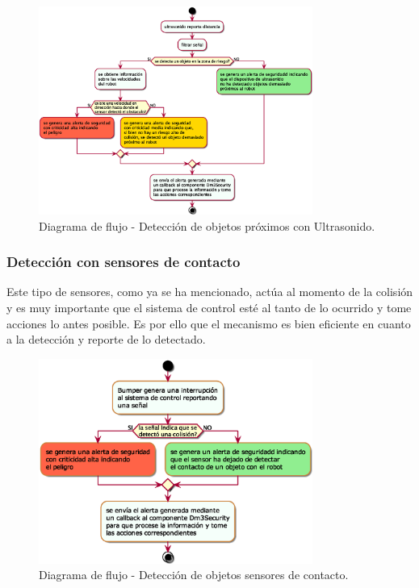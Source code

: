 \documentclass[withindex,glossary]{cam-thesis}
\begin{document}
\begin{figure}[H]
\centering
\includegraphics[width=0.8\textwidth]{images/Diagrama_de_flujo_Dm3Security_Ultrasonic}
\caption[Diagrama de flujo - Detección de objetos próximos con Ultrasonido]{Diagrama de flujo - Detección de objetos próximos con Ultrasonido.}
\end{figure}

\subsubsection{Detección con sensores de contacto} \label{sec:Implementacion :: detección de objetos próximos :: Contacto}
Este tipo de sensores, como ya se ha mencionado, actúa al momento de la colisión y es muy importante que el sistema de control esté al tanto de lo ocurrido y tome acciones lo antes posible. Es por ello que el mecanismo es bien eficiente en cuanto a la detección y reporte de lo detectado.

\begin{figure}[H]
\centering
\includegraphics[width=0.8\textwidth]{images/Diagrama_de_flujo_Dm3Security_Bumper}
\caption[Diagrama de flujo - Detección de objetos con sensores de contacto]{Diagrama de flujo - Detección de objetos sensores de contacto.}
\label{fig:Diagrama de flujo - Detección de objetos con sensores de contacto}
\end{figure}
\end{document}
